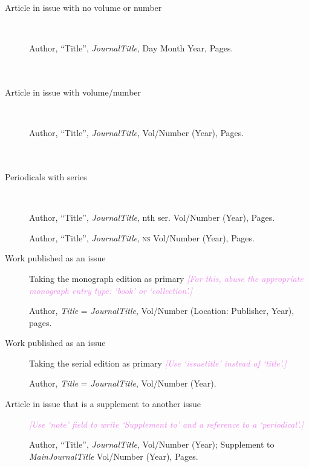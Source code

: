\documentclass[extrafontsizes,11pt,a4paper,oneside]{memoir}
\newcommand*{\lit}[1]{\textsf{#1}}
\newcommand*{\code}[1]{`\textsf{#1}'}
\newcommand*{\aside}[1]{\textcolor{violet}{\emph{[#1]}}}
\begin{document}
    \begin{description}
        \item[Article in issue with no volume or number]~
        \par Author, \enquote{Title}, \emph{JournalTitle}, Day Month Year, Pages.
        \\
        \\
        \\
        
        \item[Article in issue with volume/number]~
        \par Author, \enquote{Title}, \emph{JournalTitle}, Vol/Number (Year), Pages.
        \\
        \\
        \\
        
        \item[Periodicals with series]~
        \par Author, \enquote{Title}, \emph{JournalTitle}, nth \lit{ser}. Vol/Number (Year), Pages.
        \par Author, \enquote{Title}, \emph{JournalTitle}, \textsc{ns} Vol/Number (Year), Pages.
        \\
        
        \item[Work published as an issue] Taking the monograph edition as primary \aside{For this, abuse the appropriate monograph entry type: \code{book} or \code{collection}.}
        \par Author, \emph{Title} = \emph{JournalTitle}, Vol/Number (Location: Publisher, Year), pages.
        \\
        
        \item[Work published as an issue] Taking the serial edition as primary \aside{Use \code{issuetitle} instead of \code{title}.}
        \par Author, \emph{Title} = \emph{JournalTitle}, Vol/Number (Year).
        \\
        
        \item[Article in issue that is a supplement to another issue] \aside{Use \code{note} field to write ‘Supplement to’ and a reference to a \code{periodical}.}
        \par Author, \enquote{Title}, \emph{JournalTitle}, Vol/Number (Year); \lit{Supplement to} \emph{MainJournalTitle} Vol/Number (Year), Pages.
        \\
        

\end{description}
\end{document}
